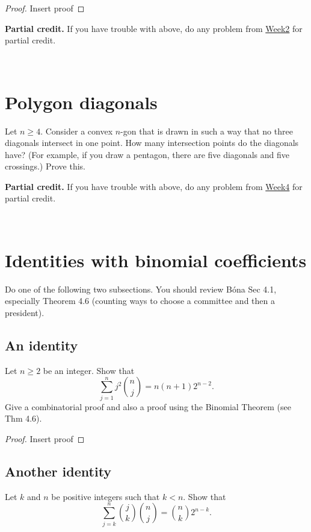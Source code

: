 \documentclass[10pt, oneside]{amsart}
\begin{document}
\begin{proof}
	Insert proof
\end{proof}

\textbf{Partial credit.}
If you have trouble with above, do any problem from 
\href{https://egunawan.github.io/combinatorics/hw/wk2problems.pdf}
{Week2} for partial credit.



~




\section{Polygon diagonals}
Let $n\geq 4$. Consider a convex $n$-gon that is drawn in such a way that no three diagonals intersect in one point. How many intersection points do the diagonals have? (For example, if you draw a pentagon, there are five diagonals and five crossings.) Prove this. 

\textbf{Partial credit.}
If you have trouble with above,   do any problem from 
\href{https://egunawan.github.io/combinatorics/hw/wk4problems.pdf}
{Week4} for partial credit.





~ 


\section{Identities with binomial coefficients}


 Do one of the following two subsections. 
You should review B\'ona Sec 4.1, especially Theorem 4.6 (counting ways to choose a committee and then a president).


\subsection{An identity}
Let $n \geq 2$ be an integer.
Show that 
\[
\sum_{j=1}^n j^2 {n \choose j} = n (n+1) 2^{n-2}.
\]
Give a combinatorial proof and also a proof using the Binomial Theorem (see Thm 4.6). 

\begin{proof}
Insert proof
\end{proof}


\subsection{Another identity}
Let $k$ and $n$ be positive integers such that $k < n$. 
Show that 
\[
\sum_{j=k}^n {j \choose k } {n \choose j} =  {n \choose k} 2^{n-k}.
\]
\end{document}
